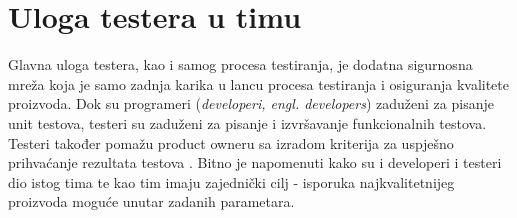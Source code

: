 \section{Uloga testera u timu}
Glavna uloga testera, kao i samog procesa testiranja, je dodatna sigurnosna mreža koja je samo zadnja karika u lancu procesa testiranja i osiguranja kvalitete proizvoda.
Dok su programeri (\textit{developeri, engl. developers}) zaduženi za pisanje unit testova,  testeri su zaduženi za pisanje i izvršavanje funkcionalnih testova.
Testeri također pomažu product owneru sa izradom kriterija za uspješno prihvaćanje rezultata testova \cite{mundra2013practical}.
Bitno je napomenuti kako su i developeri i testeri dio istog tima te  kao tim imaju zajednički cilj - isporuka najkvalitetnijeg proizvoda moguće unutar zadanih parametara.

